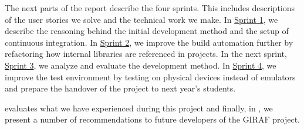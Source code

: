 The next parts of the report describe the four sprints. This includes descriptions of the user stories we solve and the technical work we make. In \hyperref[sprint:1]{Sprint 1}, we describe the reasoning behind the initial development method and the setup of continuous integration. In \hyperref[sprint:2]{Sprint 2}, we improve the build automation further by refactoring how internal libraries are referenced in projects. In the next sprint, \hyperref[sprint:3]{Sprint 3}, we analyze and evaluate the development method. In \hyperref[sprint:4]{Sprint 4}, we improve the test environment by testing on physical devices instead of emulators and prepare the handover of the project to next year's students.

 evaluates what we have experienced during this project and finally, in , we present a number of recommendations to future developers of the GIRAF project.